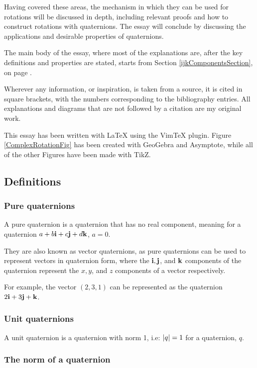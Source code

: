 \documentclass[10pt]{article}
\begin{document}
Having covered these areas, the mechanism in which they can be used for rotations will be discussed in depth, including relevant proofs and how to construct rotations with quaternions. The essay will conclude by discussing the applications and desirable properties of quaternions.

The main body of the essay, where most of the explanations are, after the key definitions and properties are stated, starts from Section \ref{ijkComponentsSection}, on page \pageref{ijkComponentsSection}.

Wherever any information, or inspiration, is taken from a source, it is cited in square brackets, with the numbers corresponding to the bibliography entries. All explanations and diagrams that are not followed by a citation are my original work.

This essay has been written with \LaTeX{} using the VimTeX plugin. Figure \ref{ComplexRotationFig} has been created with GeoGebra and Asymptote, while all of the other Figures have been made with TikZ.

\subsection{Definitions}

\subsubsection{Pure quaternions} \label{PureDef}

A pure quaternion is a quaternion that has no real component, meaning for a quaternion $a + b\vb{i} + c\vb{j} + d\vb{k}$, $a = 0$. \cite{Math431}

They are also known as vector quaternions, as pure quaternions can be used to represent vectors in quaternion form, where the $\vb{i, j}$, and $\vb{k}$ components of the quaternion represent the $x, y$, and $z$ components of a vector respectively.

For example, the vector $(2,3,1)$ can be represented as the quaternion $2\vb{i} + 3\vb{j} + \vb{k}$.

\subsubsection{Unit quaternions}

A unit quaternion is a quaternion with norm 1, i.e: $\abs{q} = 1$ for a quaternion, $q$. \cite{DRose}

\subsubsection{The norm of a quaternion}
\end{document}

